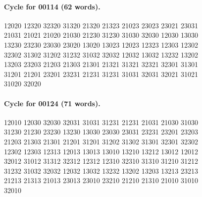 \documentclass[11pt]{article}
\theoremstyle{remark}
\numberwithin{equation}{section}
\begin{document}
\paragraph{Cycle for 00114 (62 words).}
\begingroup\footnotesize\ttfamily\begin{flushleft}
12020 12320 32320 31320 21320 21323 21023 23023 23021 23031\\
21031 21021 21020 21030 21230 31230 31030 32030 12030 13030\\
13230 23230 23030 23020 13020 13023 12023 12323 12303 12302\\
32302 31302 31202 31232 31032 32032 12032 13032 13232 13202\\
13203 23203 21203 21303 21301 21321 31321 32321 32301 31301\\
31201 21201 23201 23231 21231 31231 31031 32031 32021 31021\\
31020 32020\\
\end{flushleft}\endgroup
\paragraph{Cycle for 00124 (71 words).}
\begingroup\footnotesize\ttfamily\begin{flushleft}
12010 12030 32030 32031 31031 31231 21231 21031 21030 31030\\
31230 21230 23230 13230 13030 23030 23031 23231 23201 23203\\
21203 21303 21301 21201 31201 31202 31302 31301 32301 32302\\
12302 12303 12313 12013 13013 13010 13210 13212 13012 12012\\
32012 31012 31312 32312 12312 12310 32310 31310 31210 31212\\
31232 31032 32032 12032 13032 13232 13202 13203 13213 23213\\
21213 21313 21013 23013 23010 23210 21210 21310 21010 31010\\
32010\\
\end{flushleft}\endgroup
\end{document}
